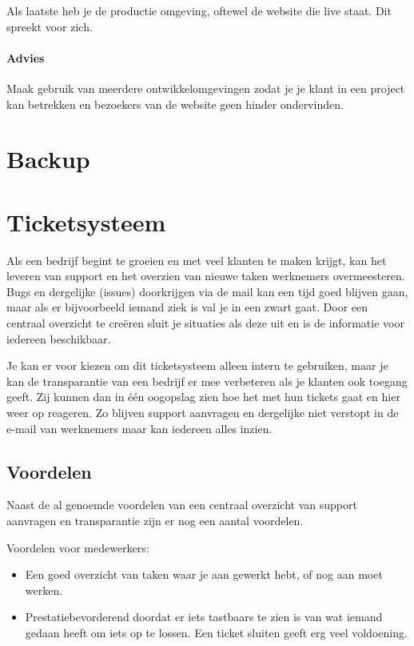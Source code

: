 Als laatste heb je de productie omgeving, oftewel de website die live staat. Dit spreekt voor zich.

\paragraph{Advies} Maak gebruik van meerdere ontwikkelomgevingen zodat je je klant in een project kan betrekken en bezoekers van de website geen hinder ondervinden.

\section{Backup}



\section{Ticketsysteem}

Als een bedrijf begint te groeien en met veel klanten te maken krijgt, kan het leveren van support en het overzien van nieuwe taken werknemers overmeesteren. Bugs en dergelijke (issues) doorkrijgen via de mail kan een tijd goed blijven gaan, maar als er bijvoorbeeld iemand ziek is val je in een zwart gaat. Door een centraal overzicht te cre\"{e}ren sluit je situaties als deze uit en is de informatie voor iedereen beschikbaar.

Je kan er voor kiezen om dit ticketsysteem alleen intern te gebruiken, maar je kan de transparantie van een bedrijf er mee verbeteren als je klanten ook toegang geeft. Zij kunnen dan in \'{e}\'{e}n oogopslag zien hoe het met hun tickets gaat en hier weer op reageren. Zo blijven support aanvragen en dergelijke niet verstopt in de e-mail van werknemers maar kan iedereen alles inzien. 

\subsection{Voordelen}

Naast de al genoemde voordelen van een centraal overzicht van support aanvragen en transparantie zijn er nog een aantal voordelen.

Voordelen voor medewerkers:

\begin{itemize}
  \item Een goed overzicht van taken waar je aan gewerkt hebt, of nog aan moet werken.
  \item Prestatiebevorderend doordat er iets tastbaars te zien is van wat iemand gedaan heeft om iets op te lossen. Een ticket sluiten geeft erg veel voldoening.
\end{itemize}

